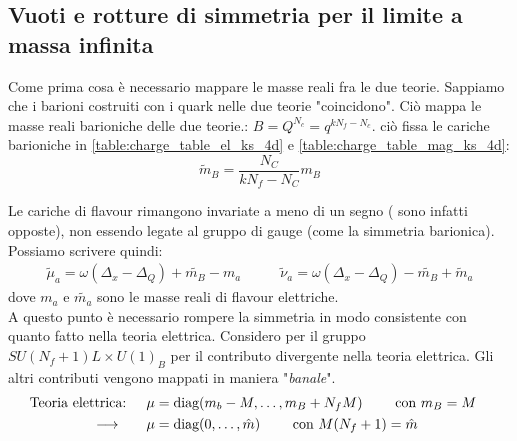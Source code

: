 \documentclass[a4paper,12pt]{article}
\begin{document}
\subsection{Vuoti e rotture di simmetria per il limite a massa infinita}
Come prima cosa è necessario mappare le masse reali fra le due teorie. Sappiamo che i barioni costruiti con i quark nelle due teorie "coincidono". Ciò mappa le masse reali barioniche delle due teorie.: $ B = Q^{N_c} = q^{k N_f - N_c} $. ciò fissa  le cariche barioniche in \ref{table:charge_table_el_ks_4d} e \ref{table:charge_table_mag_ks_4d}:
$$
		\tilde{m}_B = \frac{ N_C}{ kN_f - N_C } m_B
$$

Le cariche di flavour rimangono invariate a meno di un segno ( sono infatti opposte), non essendo legate al gruppo di gauge (come la simmetria barionica).\\
Possiamo scrivere quindi:
\begin{align*}
 \tilde \mu_a = \omega ( \Delta_x - \Delta_Q ) + \tilde{m_B} - m_a    \qquad &  \tilde \nu_a = \omega ( \Delta_x - \Delta_Q ) - \tilde{m_B} + \tilde m_a  
\end{align*}
dove $ m_a$ e $\tilde{m_a}$ sono le masse reali di flavour elettriche.\\
A questo punto è necessario rompere la simmetria in modo consistente con quanto fatto nella teoria elettrica.
Considero per il gruppo $SU(N_f+1)L \times U(1)_B$ per il contributo divergente nella teoria elettrica. Gli altri contributi vengono mappati in maniera "\emph{banale}".
\begin{align*}
\hbox{Teoria elettrica: }  \quad &  \mu = \mbox{diag} ( m_b - M, \dots , m_B+ N_f M) \qquad \mbox{ con } m_B = M \quad \\
 \longrightarrow  \qquad & \mu = \mbox{diag} ( 0, \dots , \hat{m}) \qquad \mbox{ con } M(N_f+1) = \hat{m} 
\end{align*}
\end{document}
